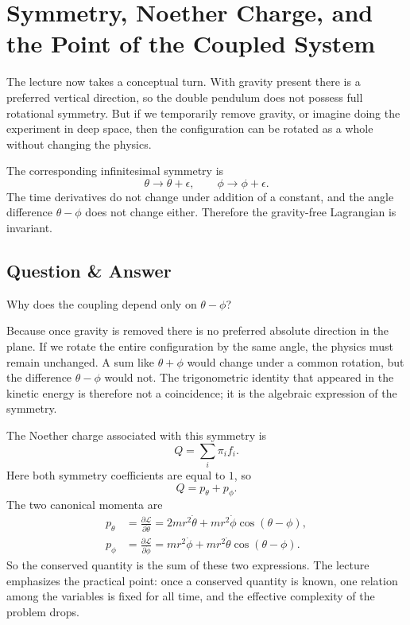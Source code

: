 \section{Symmetry, Noether Charge, and the Point of the Coupled System}

The lecture now takes a conceptual turn. With gravity present there is a preferred vertical direction, so the double pendulum does not possess full rotational symmetry. But if we temporarily remove gravity, or imagine doing the experiment in deep space, then the configuration can be rotated as a whole without changing the physics.

The corresponding infinitesimal symmetry is
\begin{equation}
\theta\to\theta+\epsilon,
\qquad
\phi\to\phi+\epsilon.
\end{equation}
The time derivatives do not change under addition of a constant, and the angle difference \(\theta-\phi\) does not change either. Therefore the gravity-free Lagrangian is invariant.

\subsection{Question \& Answer}

Why does the coupling depend only on \(\theta-\phi\)?

Because once gravity is removed there is no preferred absolute direction in the plane. If we rotate the entire configuration by the same angle, the physics must remain unchanged. A sum like \(\theta+\phi\) would change under a common rotation, but the difference \(\theta-\phi\) would not. The trigonometric identity that appeared in the kinetic energy is therefore not a coincidence; it is the algebraic expression of the symmetry.

The Noether charge associated with this symmetry is
\begin{equation}
Q=\sum_i \pi_i f_i.
\end{equation}
Here both symmetry coefficients are equal to \(1\), so
\begin{equation}
Q=p_\theta+p_\phi.
\end{equation}
The two canonical momenta are
\begin{align}
p_\theta
&=
\frac{\partial\mathcal{L}}{\partial\dot\theta}
=
2mr^2\dot\theta+mr^2\dot\phi\cos(\theta-\phi),\\
p_\phi
&=
\frac{\partial\mathcal{L}}{\partial\dot\phi}
=
mr^2\dot\phi+mr^2\dot\theta\cos(\theta-\phi).
\end{align}
So the conserved quantity is the sum of these two expressions. The lecture emphasizes the practical point: once a conserved quantity is known, one relation among the variables is fixed for all time, and the effective complexity of the problem drops.


